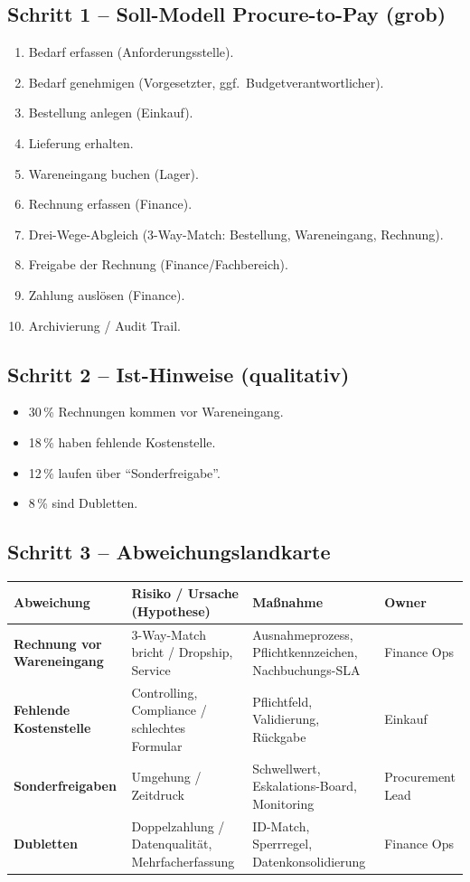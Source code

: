 \documentclass[11pt,a4paper,oneside]{article}
\begin{document}
\subsection{Schritt 1 -- Soll-Modell Procure-to-Pay (grob)}

\begin{enumerate}
  \item Bedarf erfassen (Anforderungsstelle).
  \item Bedarf genehmigen (Vorgesetzter, ggf.\ Budgetverantwortlicher).
  \item Bestellung anlegen (Einkauf).
  \item Lieferung erhalten.
  \item Wareneingang buchen (Lager).
  \item Rechnung erfassen (Finance).
  \item Drei-Wege-Abgleich (3-Way-Match: Bestellung, Wareneingang, Rechnung).
  \item Freigabe der Rechnung (Finance/Fachbereich).
  \item Zahlung auslösen (Finance).
  \item Archivierung / Audit Trail.
\end{enumerate}

\subsection{Schritt 2 -- Ist-Hinweise (qualitativ)}

\begin{itemize}
  \item 30\,\% Rechnungen kommen vor Wareneingang.
  \item 18\,\% haben fehlende Kostenstelle.
  \item 12\,\% laufen über ``Sonderfreigabe''.
  \item 8\,\% sind Dubletten.
\end{itemize}

\subsection{Schritt 3 -- Abweichungslandkarte}

\begin{tabularx}{\linewidth}{@{}>{\bfseries}lXll@{}}
\toprule
Abweichung & Risiko / Ursache (Hypothese) & Maßnahme & Owner \\
\midrule
Rechnung vor Wareneingang & 3-Way-Match bricht / Dropship, Service & Ausnahmeprozess, Pflichtkennzeichen, Nachbuchungs-SLA & Finance Ops \\
Fehlende Kostenstelle & Controlling, Compliance / schlechtes Formular & Pflichtfeld, Validierung, Rückgabe & Einkauf \\
Sonderfreigaben & Umgehung / Zeitdruck & Schwellwert, Eskalations-Board, Monitoring & Procurement Lead \\
Dubletten & Doppelzahlung / Datenqualität, Mehrfacherfassung & ID-Match, Sperrregel, Datenkonsolidierung & Finance Ops \\
\bottomrule
\end{tabularx}
\end{document}
